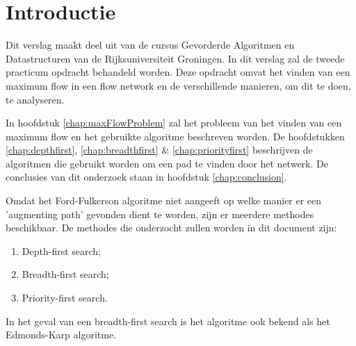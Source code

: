 \chapter{Introductie}

Dit verslag maakt deel uit van de cursus Gevorderde Algoritmen en Datastructuren van de Rijksuniversiteit Groningen. 
In dit verslag zal de tweede practicum opdracht behandeld worden. 
Deze opdracht omvat het vinden van een maximum flow in een flow network en de verschillende manieren, om dit te doen, te analyseren.

In hoofdstuk \ref{chap:maxFlowProblem} zal het probleem van het vinden van een maximum flow en het gebruikte algoritme beschreven worden. De hoofdstukken \ref{chap:depthfirst}, \ref{chap:breadthfirst} \& \ref{chap:priorityfirst} beschrijven de algoritmen die gebruikt worden om een pad te vinden door het netwerk. De conclusies van dit onderzoek staan in hoofdstuk \ref{chap:conclusion}.

Omdat het Ford-Fulkerson algoritme niet aangeeft op welke manier er een 'augmenting path' gevonden dient te worden, zijn er meerdere methodes beschikbaar.
De methodes die onderzocht zullen worden in dit document zijn:

\begin{enumerate}
	\item Depth-first search;
	\item Breadth-first search;
	\item Priority-first search.
\end{enumerate}

In het geval van een breadth-first search is het algoritme ook bekend als het Edmonds-Karp algoritme.